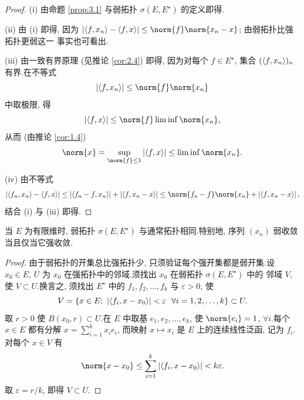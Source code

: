 \begin{proof}
(i) 由命题  \ref{prop:3.1} 与弱拓扑 $\sigma(E,E^\star)$ 的定义即得.

(ii) 由 (i) 即得, 因为
$\abs{\dual{f}{x_n}-\dual{f}{x}}\le\norm{f}\norm{x_n-x}$; 由弱拓扑比强拓扑更弱这一
事实也可看出.

(iii) 由一致有界原理 (见推论  \ref{cor:2.4}) 即得, 因为对每个 $f\in E^\star$, 集合
$(\left\langle f,x_n\right\rangle)_n$ 有界.在不等式
\begin{equation*}
\abs{\dual{f}{x_n}}\le\norm{f}\norm{x_n}
\end{equation*}
中取极限, 得
\begin{equation*}
\abs{\dual{f}{x}}\le\norm{f}\liminf\norm{x_n},
\end{equation*}
从而 (由推论  \ref{cor:1.4})
\begin{equation*}
\norm{x}=\sup_{\norm{f}\le1}\abs{\dual{f}{x}}\le\liminf\norm{x_n}.
\end{equation*}

(iv) 由不等式
\begin{equation*}
\abs{\dual{f_n}{x_n}-\dual{f}{x}}
\le\abs{\dual{f_n-f}{x_n}}+\abs{\dual{f}{x_n-x}}
\le\norm{f_n-f}\norm{x_n}+\abs{\dual{f}{x_n-x}},
\end{equation*}
结合 (i) 与 (iii) 即得.
\end{proof}

\begin{keyproposition}
\label{prop:3.6}
当 $E$ 为有限维时, 弱拓扑 $\sigma(E,E^\star)$ 与通常拓扑相同.特别地, 序列
$(x_n)$ 弱收敛当且仅当它强收敛.
\end{keyproposition}

\begin{proof}
由于弱拓扑的开集总比强拓扑少, 只须验证每个强开集都是弱开集.设 $x_0\in E$,
$U$ 为 $x_0$ 在强拓扑中的邻域.须找出 $x_0$ 在弱拓扑 $\sigma(E,E^\star)$ 中的
邻域 $V$, 使 $V\subset U$.换言之, 须找出 $E^\star$ 中的
$f_1,f_2,\dots,f_k$ 与 $\varepsilon>0$, 使
\begin{equation*}
V=\{x\in E;\ \abs{\dual{f_i}{x-x_0}}<\varepsilon\ \ \forall i=1,2,\dots,k\}\subset U.
\end{equation*}
取 $r>0$ 使 $B(x_0,r)\subset U$.在 $E$ 中取基 $e_1,e_2,\dots,e_k$, 使
$\norm{e_i}=1$, $\forall i$.每个 $x\in E$ 都有分解
$x=\sum_{i=1}^k x_ie_i$, 而映射 $x\mapsto x_i$ 是 $E$ 上的连续线性泛函, 记为
$f_i$.对每个 $x\in V$ 有
\begin{equation*}
\norm{x-x_0}\le\sum_{i=1}^k\abs{\dual{f_i}{x-x_0}}<k\varepsilon.
\end{equation*}
取 $\varepsilon=r/k$, 即得 $V\subset U$.
\end{proof}

